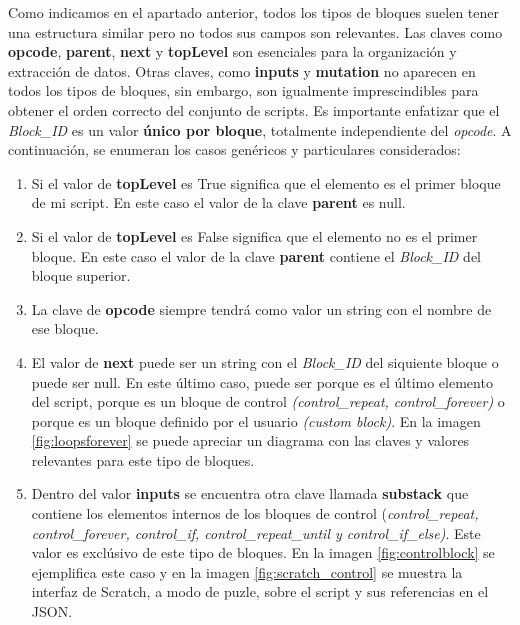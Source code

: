 \documentclass[a4paper, 12pt]{book}
\begin{document}
\newpage 
Como indicamos en el apartado anterior, todos los tipos de bloques suelen tener una estructura similar pero no todos sus campos son relevantes. Las claves como \textbf{opcode}, \textbf{parent}, \textbf{next} y \textbf{topLevel} son esenciales para la organización y extracción de datos. Otras claves, como \textbf{inputs} y \textbf{mutation} no aparecen en todos los tipos de bloques, sin embargo, son igualmente imprescindibles para obtener el orden correcto del conjunto de scripts. Es importante enfatizar que el \textit{Block\_ID} es un valor \textbf{único por bloque}, totalmente independiente del \textit{opcode}. A continuación, se enumeran los casos genéricos y particulares considerados:

\begin{enumerate}

\item Si el valor de \textbf{topLevel} es True significa que el elemento es el primer bloque de mi script. En este caso el valor de la clave \textbf{parent} es null. 

\item Si el valor de \textbf{topLevel} es False significa que el elemento no es el primer bloque. En este caso el valor de la clave \textbf{parent} contiene el \textit{Block\_ID} del bloque superior.

\item La clave de \textbf{opcode} siempre tendrá como valor un string con el nombre de ese bloque.


\item El valor de \textbf{next} puede ser un string con el \textit{Block\_ID} del siquiente bloque o puede ser null. En este último caso, puede ser porque es el último elemento del script, porque es un bloque de control \textit{(control\_repeat, control\_forever)} o porque es un bloque definido por el usuario \textit{(custom block)}. En la imagen \ref{fig:loopsforever} se puede apreciar un diagrama con las claves y valores relevantes para este tipo de bloques.

\item Dentro del valor \textbf{inputs} se encuentra otra clave llamada \textbf{substack} que contiene los elementos internos de los bloques de control (\textit{control\_repeat, control\_forever, control\_if, control\_repeat\_until y control\_if\_else)}. Este valor es exclúsivo de este tipo de bloques. En la imagen \ref{fig:controlblock} se ejemplifica este caso y en la imagen \ref{fig:scratch_control} se muestra la interfaz de Scratch, a modo de puzle, sobre el script y sus referencias en el JSON.


\end{enumerate}
\end{document}
